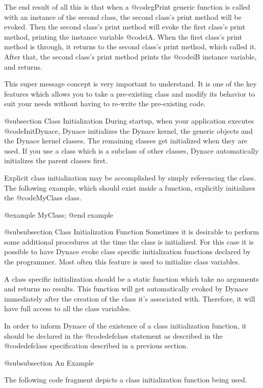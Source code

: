 The end result of all this is that when a @code{gPrint} generic function is
called with an instance of the second class, the second class's print method
will be evoked.  Then the second class's print method will evoke the first
class's print method, printing the instance variable @code{iA}.  When the
first class's print method is through, it returns to the second class's
print method, which called it.  After that, the second class's print
method prints the @code{iB} instance variable, and returns.

This super message concept is very important to understand.  It is one
of the key features which allows you to take a pre-existing class and
modify its behavior to suit your needs without having to re-write the
pre-existing code.

@subsection Class Initialization
During startup, when your application executes @code{InitDynace},
Dynace initializes the Dynace kernel, the generic objects and
the Dynace kernel classes.  The remaining classes get initialized
when they are used.  If you use a class which is a subclass of
other classes, Dynace automatically initializes the parent classes
first.

Explicit class initialization may be accomplished by simply referencing
the class.  The following example, which should exist inside a function,
explicitly initializes the @code{MyClass} class.

@example
        MyClass;
@end example

@subsubsection Class Initialization Function
Sometimes it is desirable to perform some additional procedures at the
time the class is initialized.  For this case it is possible to have
Dynace evoke class specific initialization functions declared by the
programmer.  Most often this feature is used to initialize class
variables.

A class specific initialization should be a static function which
take no arguments and returns no results.  This function will
get automatically evoked by Dynace immediately after the creation
of the class it's associated with.  Therefore, it will have full
access to all the class variables.

In order to inform Dynace of the existence of a class initialization
function, it should be declared in the @code{defclass} statement as
described in the @code{defclass} specification described in a previous
section.


@subsubsection An Example

The following code fragment depicts a class initialization function
being used.

